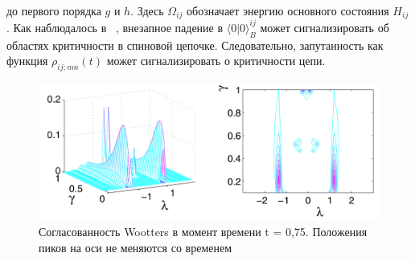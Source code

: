 \documentclass[11pt]{article}
\begin{document}
до первого порядка $g$ и $h$. Здесь $\Omega_{ij}$ обозначает энергию основного состояния $H_{ij}$. Как наблюдалось в ~\cite{b26}, внезапное падение в $\langle 0|0 \rangle_B^{ij}$ может сигнализировать об областях критичности в спиновой цепочке. Следовательно, запутанность как функция $\rho_{ij;mn}(t)$ может сигнализировать о критичности цепи.

\begin{figure}[htp]
	\centering
	\includegraphics[scale=0.28]{fig4}
	\caption {Согласованность Wootters в момент времени t = 0,75. Положения пиков на оси не меняются со временем ~\cite{yi}}
	\label{}
\end{figure}
\end{document}
